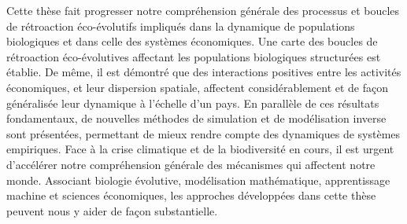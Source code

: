 {Cette thèse fait progresser notre compréhension générale des processus et boucles de rétroaction éco-évolutifs impliqués dans la dynamique de populations biologiques et dans celle des systèmes économiques. Une carte des boucles de rétroaction éco-évolutives affectant les populations biologiques structurées est établie. De même, il est démontré que des interactions positives entre les activités économiques, et leur dispersion spatiale, affectent considérablement et de façon généralisée leur dynamique à l'échelle d'un pays. En parallèle de ces résultats fondamentaux, de nouvelles méthodes de simulation et de modélisation inverse sont présentées, permettant de mieux rendre compte des dynamiques de systèmes empiriques. Face à la crise climatique et de la biodiversité en cours, il est urgent d'accélérer notre compréhension générale des mécanismes qui affectent notre monde. Associant biologie évolutive, modélisation mathématique, apprentissage machine et sciences économiques, les approches développées dans cette thèse peuvent nous y aider de façon substantielle.}

